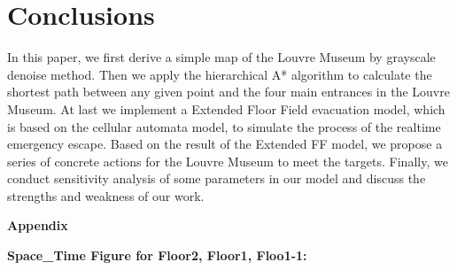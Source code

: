 \documentclass{mcmthesis}
\begin{document}
\section{Conclusions}
In this paper, we first derive a simple map of the Louvre Museum by grayscale denoise method. Then we apply the hierarchical A* algorithm to calculate the shortest path between any given point and the four main entrances in the Louvre Museum. At last we implement a Extended Floor Field evacuation model, which is based on the cellular automata model, to simulate the process of the realtime emergency escape. Based on the result of the Extended FF model, we propose a series of concrete actions for the Louvre Museum to meet the targets. Finally, we conduct sensitivity analysis of some parameters in our model and discuss the strengths and weakness of our work.





\newpage
\noindent\textbf{\LARGE{Appendix}}

\small

\noindent\textbf{\Large{Space_Time Figure for Floor2, Floor1, Floo1-1:}}\\
\end{document}
